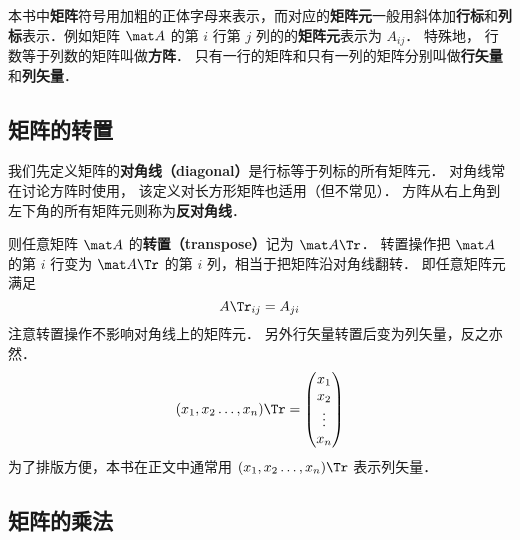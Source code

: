 

本书中\textbf{矩阵}符号用加粗的正体字母来表示，而对应的\textbf{矩阵元}一般用斜体加\textbf{行标}和\textbf{列标}表示．例如矩阵 $\mat A$ 的第 $i$ 行第 $j$ 列的的\textbf{矩阵元}表示为 $A_{ij}$． 特殊地， 行数等于列数的矩阵叫做\textbf{方阵}． 只有一行的矩阵和只有一列的矩阵分别叫做\textbf{行矢量}和\textbf{列矢量}．

\subsection{矩阵的转置}

我们先定义矩阵的\textbf{对角线（diagonal）}是行标等于列标的所有矩阵元． 对角线常在讨论方阵时使用， 该定义对长方形矩阵也适用（但不常见）． 方阵从右上角到左下角的所有矩阵元则称为\textbf{反对角线}．

则任意矩阵 $\mat A$ 的\textbf{转置（transpose）}记为 $\mat A\Tr$． 转置操作把 $\mat A$ 的第 $i$ 行变为 $\mat A\Tr$ 的第 $i$ 列，相当于把矩阵沿对角线翻转． 即任意矩阵元满足
\begin{equation}\label{Mat_eq3}
A\Tr_{ij} = A_{ji}
\end{equation}
注意转置操作不影响对角线上的矩阵元． 另外行矢量转置后变为列矢量，反之亦然．
\begin{equation}\label{Mat_eq2}
(x_1,x_2 \dots, x_n)\Tr = \begin{pmatrix} x_1\\x_2\\ \vdots\\x_n \end{pmatrix}
\end{equation}
为了排版方便，本书在正文中通常用 $(x_1,x_2 \dots, x_n)\Tr$ 表示列矢量．

\subsection{矩阵的乘法}

